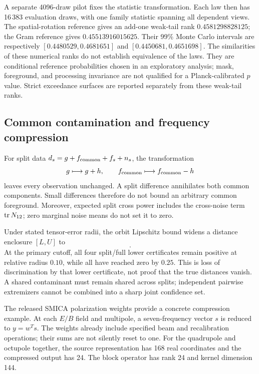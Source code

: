 A separate 4096-draw pilot fixes the statistic transformation. Each law then has 16\,383 evaluation draws, with one family statistic spanning all dependent views. The spatial-rotation reference gives an add-one weak-tail rank $0.4581298828125$; the Gram reference gives $0.45513916015625$. Their 99\% Monte Carlo intervals are respectively $[0.4480529,0.4681651]$ and $[0.4450681,0.4651698]$. The similarities of these numerical ranks do not establish equivalence of the laws. They are conditional reference probabilities chosen in an exploratory analysis; mask, foreground, and processing invariance are not qualified for a Planck-calibrated $p$ value. Strict exceedance surfaces are reported separately from these weak-tail ranks.

\subsection{Common contamination and frequency compression}

For split data $d_s=g+f_{\rm common}+f_s+n_s$, the transformation
\begin{equation}
 g\longmapsto g+h,\qquad
 f_{\rm common}\longmapsto f_{\rm common}-h
 \label{eq:commonmode}
\end{equation}
leaves every observation unchanged. A split difference annihilates both common components. Small differences therefore do not bound an arbitrary common foreground. Moreover, expected split cross power includes the cross-noise term $\operatorname{tr} N_{12}$; zero marginal noise means do not set it to zero.

Under stated tensor-error radii, the orbit Lipschitz bound widens a distance enclosure $[L,U]$ to
\begin{equation}
 [(L-r_1-r_2)_+,\ U+r_1+r_2].
\end{equation}
At the primary cutoff, all four split/full lower certificates remain positive at relative radius $0.10$, while all have reached zero by $0.25$. This is loss of discrimination by that lower certificate, not proof that the true distances vanish. A shared contaminant must remain shared across splits; independent pairwise extremizers cannot be combined into a sharp joint confidence set.

The released SMICA polarization weights provide a concrete compression example. At each $E/B$ field and multipole, a seven-frequency vector $s$ is reduced to $y=w^Ts$. The weights already include specified beam and recalibration operations; their sums are not silently reset to one. For the quadrupole and octupole together, the source representation has 168 real coordinates and the compressed output has 24. The block operator has rank 24 and kernel dimension 144.

